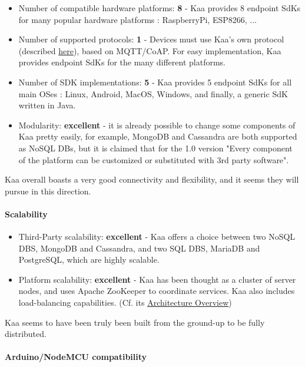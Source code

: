 \documentclass{article}
\begin{document}
\begin{itemize}
\item Number of compatible hardware platforms: \textbf{8} - Kaa provides 8 endpoint SdKs for many popular hardware platforms : RaspberryPi, ESP8266, ...
\item Number of supported protocols: \textbf{1} - Devices must use Kaa's own protocol (described \href{https://github.com/kaaproject/kaa-rfcs/}{here}), based on MQTT/CoAP. For easy implementation, Kaa provides endpoint SdKs for the many different platforms.
\item Number of SDK implementations: \textbf{5} - Kaa provides 5 endpoint SdKs for all main OSes : Linux, Android, MacOS, Windows, and finally, a generic SdK written in Java.
\item Modularity: \textbf{excellent} - it is already possible to change some components of Kaa pretty easily, for example, MongoDB and Cassandra are both supported as NoSQL DBs, but it is claimed that for the 1.0 version "Every component of the platform can be customized or substituted with 3rd party software".
\end{itemize}

Kaa overall boasts a very good connectivity and flexibility, and it seems they will pursue in this direction.

\paragraph{Scalability}

\begin{itemize}
\item Third-Party scalability: \textbf{excellent} - Kaa offers a choice between two NoSQL DBS, MongoDB and Cassandra, and two SQL DBS, MariaDB and PostgreSQL, which are highly scalable.
\item Platform scalability: \textbf{excellent} - Kaa has been thought as a cluster of server nodes, and uses Apache ZooKeeper to coordinate services. Kaa also includes load-balancing capabilities. (Cf. its \href{https://kaaproject.github.io/kaa/docs/v0.10.0/Architecture-overview/}{Architecture Overview})
\end{itemize}

Kaa seems to have been truly been built from the ground-up to be fully distributed.

\paragraph{Arduino/NodeMCU compatibility}
\end{document}
